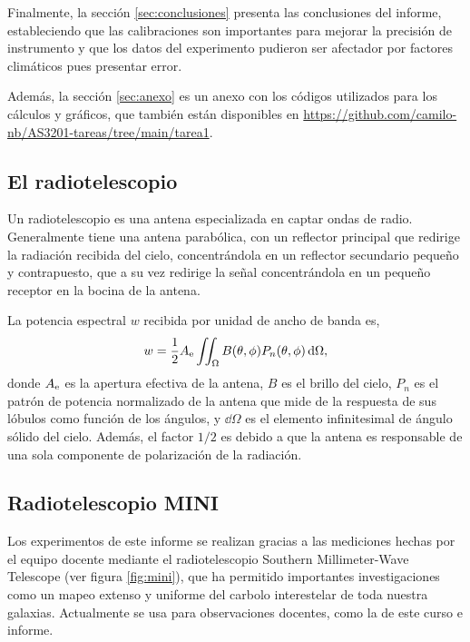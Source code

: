 Finalmente, la sección \ref{sec:conclusiones} presenta las conclusiones del informe, estableciendo que las calibraciones son importantes para mejorar la precisión de instrumento y que los datos del experimento pudieron ser afectador por factores climáticos pues presentar error.

Además, la sección \ref{sec:anexo} es un anexo con los códigos utilizados para los cálculos y gráficos, que también están disponibles en \url{https://github.com/camilo-nb/AS3201-tareas/tree/main/tarea1}.

\subsection{El radiotelescopio}\label{sec:radiotelescopio}

Un radiotelescopio es una antena especializada en captar ondas de radio. Generalmente tiene una antena parabólica, con un reflector principal que redirige la radiación recibida del cielo, concentrándola en un reflector secundario pequeño y contrapuesto, que a su vez redirige la señal concentrándola en un pequeño receptor en la bocina de la antena.

La potencia espectral $w$ recibida por unidad de ancho de banda es,
\begin{equation}
w=\frac{1}{2}A_\textnormal{e}\iint_\Omega{B(\theta,\phi)P_n(\theta,\phi)\dd{\Omega}}\label{eq:w}
	,\end{equation}
donde $A_\textnormal{e}$ es la apertura efectiva de la antena, $B$ es el brillo del cielo, $P_n$ es el patrón de potencia normalizado de la antena que mide de la respuesta de sus lóbulos como función de los ángulos, y $\dd{\Omega}$ es el elemento infinitesimal de ángulo sólido del cielo. Además, el factor $1/2$ es debido a que la antena es responsable de una sola componente de polarización de la radiación.

\subsection{Radiotelescopio MINI}\label{sec:mini}

Los experimentos de este informe se realizan gracias a las mediciones hechas por el equipo docente mediante el radiotelescopio Southern Millimeter-Wave Telescope (ver figura \ref{fig:mini}), que ha permitido importantes investigaciones como un mapeo extenso y uniforme del carbolo interestelar de toda nuestra galaxias. Actualmente se usa para observaciones docentes, como la de este curso e informe.

